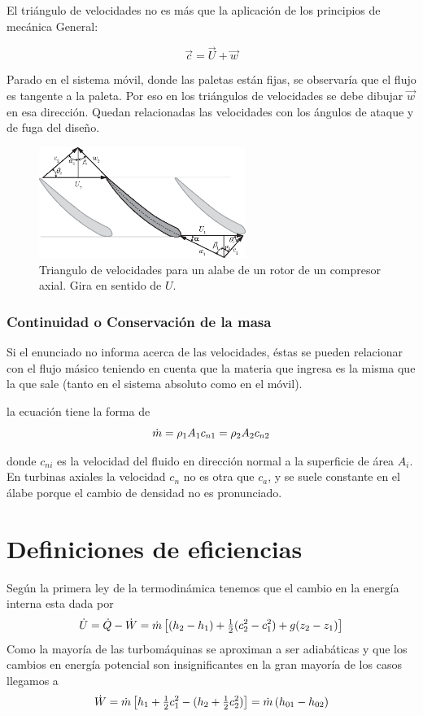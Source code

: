 \documentclass{article}
\begin{document}
El triángulo de velocidades no es más que la aplicación de los principios de mecánica General: 

\[\Vec{c}=\Vec{U}+\Vec{w}\]

Parado en el sistema móvil, donde las paletas están fijas, se observaría que el flujo es tangente a la paleta. Por eso en los triángulos de velocidades se debe dibujar $\Vec{w}$ en esa dirección. Quedan relacionadas las velocidades con los ángulos de ataque y de fuga del diseño.

\begin{figure}[htb!]
    \centering
    \includegraphics[width=0.6\textwidth]{fig/VelTrianglegeneral.eps}
    \caption{Triangulo de velocidades para un alabe de un rotor de un compresor axial. Gira en sentido de $U$.}
    \label{fig:veltrianggeneral}
\end{figure}

\subsubsection*{Continuidad o Conservación de la masa}
Si el enunciado no informa acerca de las velocidades, éstas se pueden relacionar con el flujo másico teniendo en cuenta que la materia que ingresa es la misma que la que sale (tanto en el sistema absoluto como en el móvil).

la ecuación tiene la forma de 
\[
\dot{m}=\rho_1 A_1 c_{n1} = \rho_2 A_2 c_{n2}
\]

donde $c_{ni}$ es la velocidad del fluido en dirección normal a la superficie de área $A_i$. En turbinas axiales la velocidad $c_{n}$ no es otra que $c_{a}$, y se suele constante en el álabe porque el cambio de densidad no es pronunciado. 







\section{Definiciones de eficiencias}
Según la primera ley de la termodinámica tenemos que el cambio en la energía interna esta dada por
\begin{equation}
    \dot{U} =\dot{Q} -\dot{W} = \dot{m} \left[(h_2-h_1)+\tfrac{1}{2}(c_2^2-c_1^2)+g(z_2-z_1) \right]
\end{equation}
Como la mayoría de las turbomáquinas se aproximan a ser adiabáticas y que los cambios en energía potencial son insignificantes en la gran mayoría de los casos llegamos a
\begin{equation}
    \dot{W} = \dot{m} \left[ h_1+\tfrac{1}{2}c_1^2 - (h_2+\tfrac{1}{2}c_2^2) \right] = \dot{m} \left( h_{01}-h_{02}\right)
\end{equation}
\end{document}
